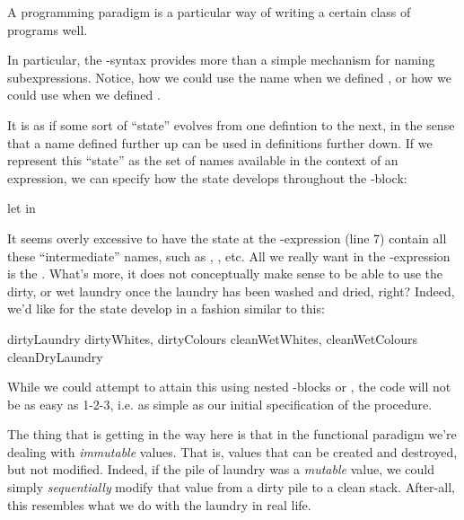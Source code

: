 \begin{definition}

A programming paradigm is a particular way of writing a certain class of
programs well.

\end{definition}

In particular, the -syntax provides more than a simple mechanism for
naming subexpressions. Notice, how we could use the name  when
we defined , or how we could use  when
we defined .

It is as if some sort of ``state'' evolves from one defintion to the next, in
the sense that a name defined further up can be used in definitions further
down. If we represent this ``state'' as the set of names available in the
context of an expression, we can specify how the state develops throughout the
-block: 

\begin{codebox}
\li let
\li in
\end{codebox}

It seems overly excessive to have the state at the -expression (line
7) contain all these ``intermediate'' names, such as ,
, etc. All we really want in the -expression is
the . What's more, it does not conceptually make sense to be
able to use the dirty, or wet laundry once the laundry has been washed and
dried, right? Indeed, we'd like for the state develop in a fashion similar to
this:

\begin{code}
{dirtyLaundry}
{dirtyWhites, dirtyColours}
{cleanWetWhites, cleanWetColours}
{cleanDryLaundry}
\end{code}

While we could attempt to attain this using nested -blocks or
, the code will not be as easy as 1-2-3, i.e.  as
simple as our initial specification of the procedure.

The thing that is getting in the way here is that in the functional paradigm
we're dealing with \emph{immutable} values. That is, values that can be created
and destroyed, but not modified. Indeed, if the pile of laundry was a
\emph{mutable} value, we could simply \emph{sequentially} modify that value
from a dirty pile to a clean stack. After-all, this resembles what we do with
the laundry in real life.

